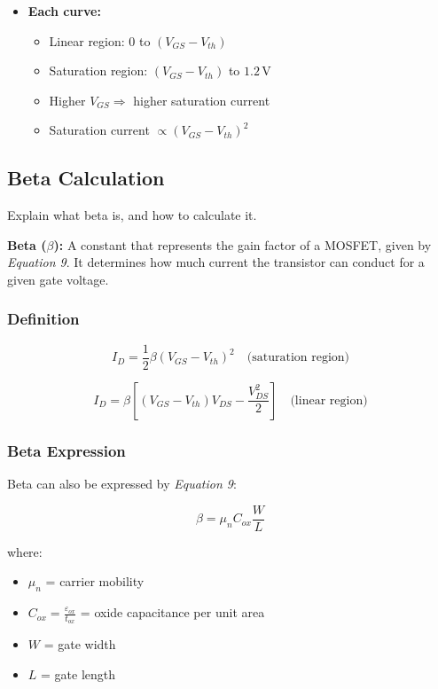 \documentclass[a4paper,12pt]{article}
\begin{document}
\begin{itemize}
\begin{itemize}
    \item \textbf{Each curve:}
      \begin{itemize}
        \item Linear region: $0$ to $(V_{GS} - V_{th})$
        \item Saturation region: $(V_{GS} - V_{th})$ to $1.2\,\text{V}$
        \item Higher $V_{GS} \Rightarrow$ higher saturation current
        \item Saturation current $\propto (V_{GS} - V_{th})^2$
      \end{itemize}
  \end{itemize}
\end{itemize}


\subsection{Beta Calculation}

Explain what beta is, and how to calculate it.

\textbf{Beta ($\beta$):} A constant that represents the gain factor of a MOSFET, given by \textit{Equation 9}.
It determines how much current the transistor can conduct for a given gate voltage.

\subsubsection{Definition}
\begin{equation}
I_D = \frac{1}{2}\beta(V_{GS} - V_{th})^2 \quad \text{(saturation region)}    
\end{equation}

\begin{equation}
I_D = \beta\left[(V_{GS} - V_{th})V_{DS} - \frac{V_{DS}^2}{2}\right] \quad \text{(linear region)}
\end{equation}

\subsubsection{Beta Expression}

Beta can also be expressed by \textit{Equation 9}:

\begin{equation}
\boxed{\beta = \mu_n C_{ox} \frac{W}{L}}
\end{equation}

where:
\begin{itemize}
    \item $\mu_n$ = carrier mobility
    \item $C_{ox} = \frac{\varepsilon_{ox}}{t_{ox}}$ = oxide capacitance per unit area
    \item $W$ = gate width
    \item $L$ = gate length
\end{itemize}
\end{document}
